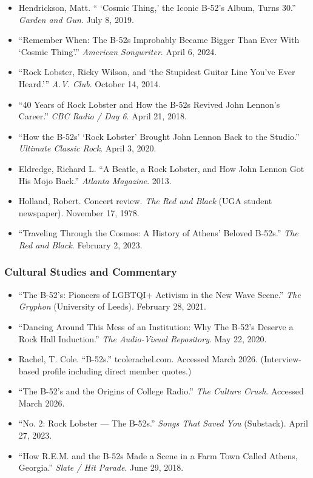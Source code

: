 \documentclass[11pt,letterpaper]{article}
\begin{document}
\begin{itemize}[noitemsep]
  \item Hendrickson, Matt. `` `Cosmic Thing,' the Iconic B-52's Album, Turns 30.'' \textit{Garden and Gun}. July 8, 2019.
  \item ``Remember When: The B-52s Improbably Became Bigger Than Ever With `Cosmic Thing'.'' \textit{American Songwriter}. April 6, 2024.
  \item ``Rock Lobster, Ricky Wilson, and `the Stupidest Guitar Line You've Ever Heard.''' \textit{A.V. Club}. October 14, 2014.
  \item ``40 Years of Rock Lobster and How the B-52s Revived John Lennon's Career.'' \textit{CBC Radio / Day 6}. April 21, 2018.
  \item ``How the B-52s' `Rock Lobster' Brought John Lennon Back to the Studio.'' \textit{Ultimate Classic Rock}. April 3, 2020.
  \item Eldredge, Richard L. ``A Beatle, a Rock Lobster, and How John Lennon Got His Mojo Back.'' \textit{Atlanta Magazine}. 2013.
  \item Holland, Robert. Concert review. \textit{The Red and Black} (UGA student newspaper). November 17, 1978.
  \item ``Traveling Through the Cosmos: A History of Athens' Beloved B-52s.'' \textit{The Red and Black}. February 2, 2023.
\end{itemize}

\subsubsection{Cultural Studies and Commentary}

\begin{itemize}[noitemsep]
  \item ``The B-52's: Pioneers of LGBTQI+ Activism in the New Wave Scene.'' \textit{The Gryphon} (University of Leeds). February 28, 2021.
  \item ``Dancing Around This Mess of an Institution: Why The B-52's Deserve a Rock Hall Induction.'' \textit{The Audio-Visual Repository}. May 22, 2020.
  \item Rachel, T. Cole. ``B-52s.'' tcolerachel.com. Accessed March 2026. (Interview-based profile including direct member quotes.)
  \item ``The B-52's and the Origins of College Radio.'' \textit{The Culture Crush}. Accessed March 2026.
  \item ``No. 2: Rock Lobster --- The B-52s.'' \textit{Songs That Saved You} (Substack). April 27, 2023.
  \item ``How R.E.M. and the B-52s Made a Scene in a Farm Town Called Athens, Georgia.'' \textit{Slate / Hit Parade}. June 29, 2018.
\end{itemize}
\end{document}
